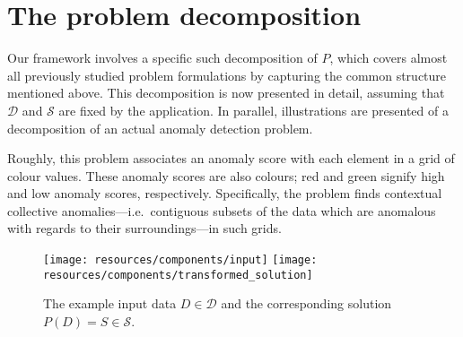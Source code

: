 \newcommand{\exinput}{\texttt{[image: resources/components/input]}}
\newcommand{\extransformedinput}{\texttt{[image: resources/components/transformed\_input]}}
\newcommand{\exevaluationset}{\texttt{[image: resources/components/evaluation\_set]}}
\newcommand{\exevaluationitem}{\texttt{[image: resources/components/evaluation\_item]}}
\newcommand{\excontext}{\texttt{[image: resources/components/context]}}
\newcommand{\exreferenceset}{\texttt{[image: resources/components/reference\_set]}}
\newcommand{\exanomalyscore}{\texttt{[image: resources/components/anomaly\_score]}}
\newcommand{\exanomalyscores}{\texttt{[image: resources/components/anomaly\_scores]}}
\newcommand{\exsolution}{\texttt{[image: resources/components/solution]}}
\newcommand{\extransformedsolution}{\texttt{[image: resources/components/transformed\_solution]}}

\section{The problem decomposition}
\label{sect:data_format}

Our framework involves a specific such decomposition of $P$, which covers almost all previously studied problem formulations by capturing the common structure mentioned above. This decomposition is now presented in detail, assuming that $\mathcal{D}$ and $\mathcal{S}$ are fixed by the application. In parallel, illustrations are presented of a decomposition of an actual anomaly detection problem.

Roughly, this problem associates an anomaly score with each element in a grid of colour values. These anomaly scores are also colours; red and green signify high and low anomaly scores, respectively. Specifically, the problem finds contextual collective anomalies---i.e.\ contiguous subsets of the data which are anomalous with regards to their surroundings---in such grids.

\begin{figure}[htb]
\begin{center}
\leavevmode
\texttt{[image: resources/components/input]}
\texttt{[image: resources/components/transformed\_solution]}
\end{center}
\caption{\small{The example input data $D \in \mathcal{D}$ and the corresponding solution $P(D) = S \in \mathcal{S}$.}}
\label{fig:dimensionality_reduction}
\end{figure}

